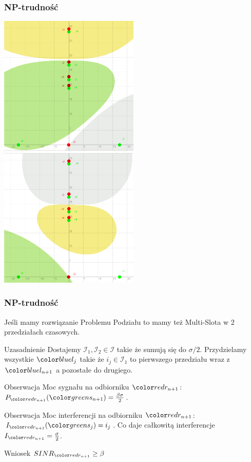 \documentclass[polish, t,10pt]{beamer}
\begin{document}
\begin{frame}
    \frametitle{NP-trudność}
    \centering
    \includegraphics[width=0.5\textwidth]{pictures/np-ok1.png}
    \includegraphics[width=0.5\textwidth]{pictures/np-ok2.png}
\end{frame}
\begin{frame}
    \frametitle{NP-trudność}
    Jeśli mamy rozwiązanie Problemu Podziału to mamy też Multi-Slota w 2 przedziałach czasowych.
    \begin{block}{Uzasadnienie}
        Dostajemy $\mathcal{I}_1, \mathcal{I}_2 \in \mathcal{I}$ takie że sumują się do $\sigma/2$. Przydzielamy wszystkie $\lj$ takie że $i_j \in \mathcal{I}_1$ to pierwszego przedziału wraz z $\lno$ a pozostałe do drugiego.
    \end{block}
    \begin{block}{Obserwacja}
        Moc sygnału na odbiorniku $\rno$: $P_\rno(\sno) = \frac{\beta\sigma}{2}$.
    \end{block}
    \begin{block}{Obserwacja}
        Moc interferencji na odbiorniku $\rno$: $I_\rno(\sj) = i_j$. Co daje całkowitą interferencje $I_\rno = \frac{\sigma}{2}$.
    \end{block}
    \pause
    \begin{block}{Wniosek}
        $SINR_\rno \geq \beta$
    \end{block}
\end{frame}
\end{document}
